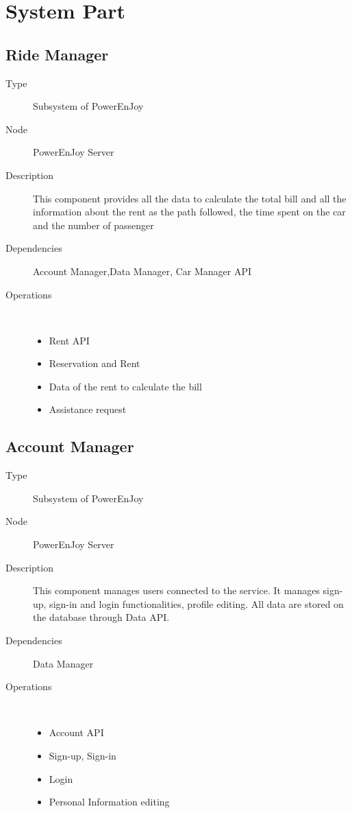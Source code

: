 \section{System Part}
\subsection{Ride Manager}
\begin{description}
	\item[Type] Subsystem of PowerEnJoy
	\item[Node] PowerEnJoy Server
	\item[Description] This component provides all the data to calculate the total bill and all the information about the rent as the path followed, the time spent on the car and the number of passenger
	\item[Dependencies] Account Manager,Data Manager, Car Manager API
	\item[Operations] \ \\
		\begin{itemize}
			\item Rent API
			\item Reservation and Rent
			\item Data of the rent to calculate the bill
			\item Assistance request
	\end{itemize}
\end{description}

\subsection{Account Manager}
\begin{description}
	\item[Type] Subsystem of PowerEnJoy
	\item[Node] PowerEnJoy Server
	\item[Description] This component manages users connected to the service. It manages sign-up, sign-in and login functionalities, profile editing. All data are stored on the database through Data API.
	\item[Dependencies] Data Manager
	\item[Operations] \ \\
		\begin{itemize}
			\item Account API
			\item Sign-up, Sign-in
			\item Login
			\item Personal Information editing
	\end{itemize}
\end{description}


